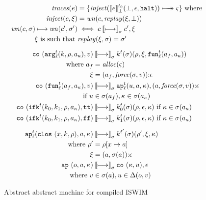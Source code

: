\documentclass[9pt]{sigplanconf} %
\begin{document}
\begin{figure}
\small
\begin{gather*}
\begin{align*}
\traces(\mexp) &= \setof{ \inject(\compile{\mexp}^\mtcntr_\bot(\bot,\epsilon,\kmt)) \multimachstep \mstate}
                    \text{ where } \\
\inject(c,\msdiff) &= \wn(c,\replay(\msdiff,\bot)) \\
\wn(c,\msto) \machstep \wn(c',\msto') &\iff c \cmachstep_\msto c',\msdiff \\
\msdiff \text{ is such that } &\replay(\msdiff,\msto) = \msto'
\end{align*}
\\[2mm]
\begin{align*}
\co{\kar[^\mcntr_\mlab]{\mcomp,\menv,\mkaddr},\mval} & \cmachstep_\msto
\mcomp^\mcntr(\msto)(\menv,\msdiff,\kfn[^\mcntr_\mlab]{\maddr_f,\mkaddr}) \\
\text{ where } \maddr_f &= \alloc(\mstate) \\
               \msdiff &= \cons{\ttuple{\maddr_f}{\force(\msto,\mval)}}{\epsilon}
\\
\co{\kfn[^\mcntr_\mlab]{\maddr_f,\mkaddr},\mval} & \cmachstep_\msto
\ap[^\mcntr_\mlab]{\mvalx{u},\maddr,\mkont},\cons{\ttuple{\maddr}{\force(\msto,\mval)}}{\epsilon} \\
\text{ if }\mvalx{u} &\in \msto(\maddr_f), \mkont \in \msto(\mkaddr)
\\
\co{\kif[^\mcntr]{\mcompi0,\mcompi1,\menv,\mkaddr},\strue} & \cmachstep_\msto
\mcompi{0}^\mcntr(\msto)(\menv,\epsilon,\mkont)
\text{ if }\mkont\in\msto(\mkaddr)
\\
\co{\kif[^\mcntr]{\mcompi0,\mcompi1,\menv,\mkaddr},\sfalse} & \cmachstep_\msto
\mcompi{1}^\mcntr(\msto)(\menv,\epsilon,\mkont)
\text{ if }\mkont\in\msto(\mkaddr)
\\[2mm]
\ap[^\mcntr_\mlab]{\clos{\mvar,\mcomp,\menv},\maddr,\mkont} & \cmachstep_\msto
\mcomp^{\mcntr'}(\msto)(\menv',\msdiff,\mkont) \\
\text{ where }\menv' &= \menv[\mvar\mapsto\maddr] \\
              \msdiff &= \cons{\ttuple{\maddr}{\msto(\maddr)}}{\epsilon}
\\
\ap{\mop,\maddr,\mkont} & \cmachstep_\msto
\co{\mkont,\mvalx{u}},\epsilon \\
\text{ where } \mval &\in \spchoice{\msto(\maddr)}{\msto(\maddr)}, \mvalx{u}\in\interpdelta(\mop,\mval)
\end{align*}
\end{gather*}
\caption{Abstract abstract machine for compiled ISWIM}
\label{fig:caam}
\end{figure}
\end{document}
